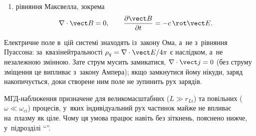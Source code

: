 \begin{enumerate}
Це \emph{резистивний} закон Ома для однорідинної МГД; $\sigma$ тут~--- скаляр, тобто $\sigma_\parallel$
(провідність уздовж поля). Поперек поля питомий опір повністю іонізованої плазми лише приблизно вдвічі більший,
$\eta_\perp\approx2\eta_\parallel$, а~не в~$(\omega_{ce}/\nu)^2$ разів ($\nu$~--- частота зіткнень електронів з~нейтралами), як було б у~слабоіонізованому газі.
Значення $\eta_\parallel=5{,}2\times10^{-5}\,\ln\Lambda/T^{3/2}$~Ом$\cdot$м (де $T$ в~еВ) і~множник~2 обчислив
Л.~Спітцер, урахувавши віддачу іонів у~кожному зіткненні й~усереднення за~розподілом електронів~\cite{chen2016introduction}.
Причина малості поперечного опору: сила тертя між електронами та~іонами залежить лише від їхньої \emph{відносної}
швидкості, тобто від струму $\vect j$, а~спільний дрейф $\vect E\times\vect B$, у~якому рухається вся плазма, тертя не створює.
Нейтральний газ, навпаки, нерухомий, і~він гальмує поперечний рух електронів. Точніший дворідинний закон
Ома~\eqref{eq:generalized-ohm-from-two-fluid} містить також холлівський доданок
$\vect j\times\vect B/enc$ і~градієнт електронного тиску $-\nabla p_e/en$, а~якщо не нехтувати
інерцією електронів~--- ще й~$-(m_e/e)\,d\vect v_e/dt$. У~простій резистивній МГД всі ці
поправки вважаються малими.

    \item рівняння Максвелла, зокрема
    \begin{equation*}
        \nabla\cdot\vect B=0,
        \qquad
        \frac{\partial\vect B}{\partial t}
        =
        -c\,\rot\vect E.
    \end{equation*}

\end{enumerate}

Електричне поле в~цій системі знаходять із~закону Ома, а~не з~рівняння Пуассона: за~квазінейтральності
$\rho_q=\nabla\cdot\vect E/4\pi$ є наслідком, а~не незалежною змінною. Зате струм мусить замикатися,
$\nabla\cdot\vect j=0$ (без струму зміщення це випливає з~закону Ампера); якщо замкнутися йому нікуди, заряд
накопичується, доки створене ним поле не зупинить рух зарядів.

МГД-наближення призначене для великомасштабних ($L\gg r_{Li}$) та повільних
($\omega\ll\omega_{ci}$) процесів, у~яких індивідуальний рух частинок майже не впливає
на~плазму як ціле. Чому ця умова працює навіть без
зіткнень, пояснено нижче, у~підрозділі \enquote{}.

